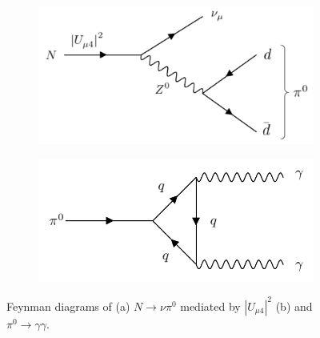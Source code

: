 
\begin{figure}[htbp!]
\begin{subfigure}[h]{0.49\linewidth}
\centering    
\includegraphics[width=\linewidth]{N_to_pi0_edit}
\caption{}
\label{fig:HNLdecaydiagram}
\end{subfigure}
\hfill
\begin{subfigure}[h]{0.49\linewidth}
\centering    
\includegraphics[width=\linewidth]{pi0_to_gam}
\caption{}
\label{fig:pi0decaydiagram}
\end{subfigure}%
\caption[decayDiagram]{
Feynman diagrams of (a) $N \rightarrow \nu \pi^0$ mediated by $|U_{\mu4}|^{2}$ (b) and $\pi^0 \rightarrow \gamma\gamma$.
}
\end{figure}




